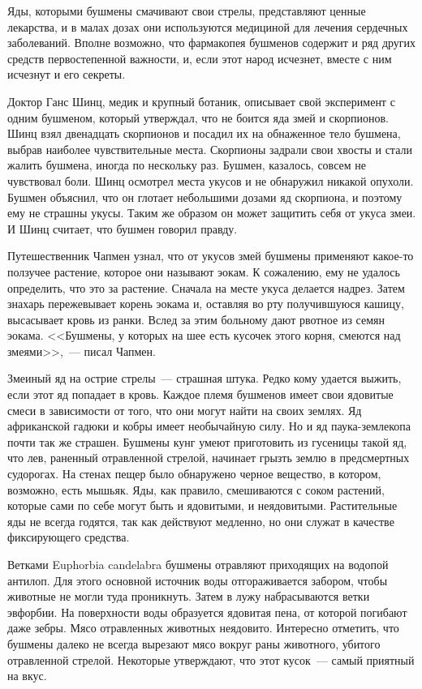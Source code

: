 \documentclass[12pt,a4paper,twoside,openany,svgnames]{memoir}
\begin{document}
Яды, которыми бушмены смачивают свои стрелы, представляют ценные лекарства, и в малах дозах они используются медициной для лечения сердечных заболеваний. Вполне возможно, что фармакопея бушменов содержит и ряд других средств первостепенной важности, и, если этот народ исчезнет, вместе с ним исчезнут и его секреты.

Доктор Ганс Шинц, медик и крупный ботаник, описывает свой эксперимент с одним бушменом, который утверждал, что не боится яда змей и скорпионов. Шинц взял двенадцать скорпионов и посадил их на обнаженное тело бушмена, выбрав наиболее чувствительные места. Скорпионы задрали свои хвосты и стали жалить бушмена, иногда по нескольку раз. Бушмен, казалось, совсем не чувствовал боли. Шинц осмотрел места укусов и не обнаружил никакой опухоли. Бушмен объяснил, что он глотает небольшими дозами яд скорпиона, и поэтому ему не страшны укусы. Таким же образом он может защитить себя от укуса змеи. И Шинц считает, что бушмен говорил правду.

Путешественник Чапмен узнал, что от укусов змей бушмены применяют какое-то ползучее растение, которое они называют эокам. К сожалению, ему не удалось определить, что это за растение. Сначала на месте укуса делается надрез. Затем знахарь пережевывает корень эокама и, оставляя во рту получившуюся кашицу, высасывает кровь из ранки. Вслед за этим больному дают рвотное из семян эокама. <<Бушмены, у которых на шее есть кусочек этого корня, смеются над змеями>>,~--- писал Чапмен.

Змеиный яд на острие стрелы~--- страшная штука. Редко кому удается выжить, если этот яд попадает в кровь. Каждое племя бушменов имеет свои ядовитые смеси в зависимости от того, что они могут найти на своих землях. Яд африканской гадюки и кобры имеет необычайную силу. Но и яд паука-землекопа почти так же страшен. Бушмены кунг умеют приготовить из гусеницы такой яд, что лев, раненный отравленной стрелой, начинает грызть землю в предсмертных судорогах. На стенах пещер было обнаружено черное вещество, в котором, возможно, есть мышьяк. Яды, как правило, смешиваются с соком растений, которые сами по себе могут быть и ядовитыми, и неядовитыми. Растительные яды не всегда годятся, так как действуют медленно, но они служат в качестве фиксирующего средства.

Ветками Euphorbia candelabra бушмены отравляют приходящих на водопой антилоп. Для этого основной источник воды отгораживается забором, чтобы животные не могли туда проникнуть. Затем в лужу набрасываются ветки эвфорбии. На поверхности воды образуется ядовитая пена, от которой погибают даже зебры. Мясо отравленных животных неядовито. Интересно отметить, что бушмены далеко не всегда вырезают мясо вокруг раны животного, убитого отравленной стрелой. Некоторые утверждают, что этот кусок~--- самый приятный на вкус.
\end{document}
